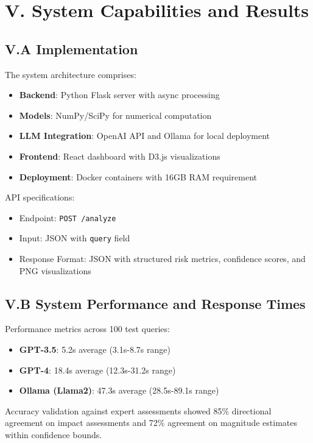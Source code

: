 \documentclass[10pt,twocolumn]{article}
\begin{document}
\section{V. System Capabilities and Results}

\subsection{V.A Implementation}

The system architecture comprises:
\begin{itemize}
\item \textbf{Backend}: Python Flask server with async processing
\item \textbf{Models}: NumPy/SciPy for numerical computation
\item \textbf{LLM Integration}: OpenAI API and Ollama for local deployment
\item \textbf{Frontend}: React dashboard with D3.js visualizations
\item \textbf{Deployment}: Docker containers with 16GB RAM requirement
\end{itemize}

API specifications:
\begin{itemize}
\item Endpoint: \texttt{POST /analyze}
\item Input: JSON with \texttt{query} field
\item Response Format: JSON with structured risk metrics, confidence scores, and PNG visualizations
\end{itemize}

\subsection{V.B System Performance and Response Times}

Performance metrics across 100 test queries:
\begin{itemize}
\item \textbf{GPT-3.5}: 5.2s average (3.1s-8.7s range)
\item \textbf{GPT-4}: 18.4s average (12.3s-31.2s range)
\item \textbf{Ollama (Llama2)}: 47.3s average (28.5s-89.1s range)
\end{itemize}

Accuracy validation against expert assessments showed 85\% directional agreement on impact assessments and 72\% agreement on magnitude estimates within confidence bounds.
\end{document}
